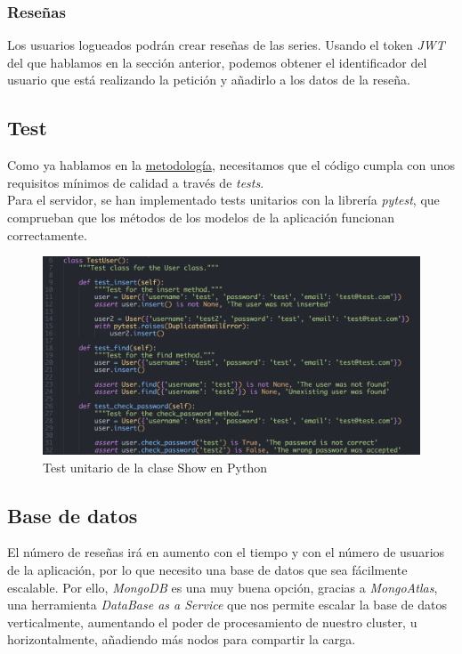 \subsubsection{Reseñas}
Los usuarios logueados podrán crear reseñas de las series. Usando el token \textit{JWT} del que hablamos en la sección
anterior, podemos obtener el identificador del usuario que está realizando la petición y añadirlo a los datos de la
reseña.\\ 

\subsection{Test}
Como ya hablamos en la \hyperref[chap:metodología]{metodología}, necesitamos que el código cumpla con unos requisitos
mínimos de calidad a través de \textit{tests}.\\

Para el servidor, se han implementado tests unitarios con la librería \textit{pytest}\cite{pytest}, que comprueban que
los métodos de los modelos de la aplicación funcionan correctamente.
\begin{figure}[H]
\centering	
    \includegraphics[scale=0.25]{img/pytest.png}
\caption{ Test unitario de la clase Show en Python }\label{fig:pytest}
\end{figure}

\subsection{Base de datos}
El número de reseñas irá en aumento con el tiempo y con el número de usuarios de la aplicación, por lo que necesito una
base de datos que sea fácilmente escalable. Por ello, \textit{MongoDB}\cite{mongodb} es una muy buena opción, gracias a
\textit{MongoAtlas}\cite{mongoatlas}, una herramienta \textit{DataBase as a Service}\cite{dbaas} que nos permite escalar
la base de datos verticalmente, aumentando el poder de procesamiento de nuestro cluster, u horizontalmente, añadiendo
más nodos para compartir la carga.\\

